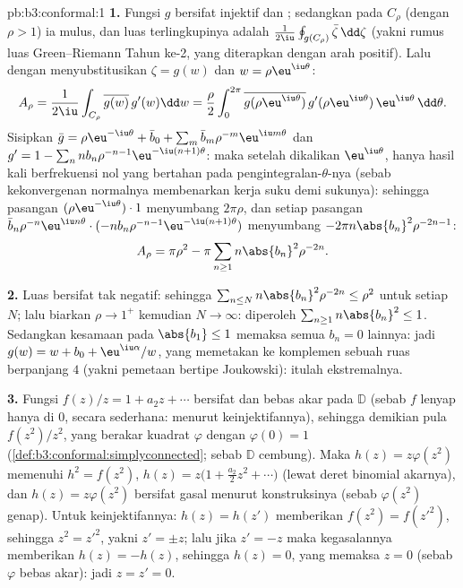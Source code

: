 \begin{solution}{pb:b3:conformal:1}
\textbf{1.} Fungsi $g$ bersifat injektif dan ; sedangkan pada $C_\rho$
(dengan $\rho > 1$) ia mulus, dan luas terlingkupinya adalah
$\frac1{2\iu}\oint_{g(C_\rho)}\bar\zeta\,\dd\zeta$ (yakni rumus luas
Green--Riemann Tahun ke-2, yang diterapkan dengan arah positif).
Lalu dengan menyubstitusikan $\zeta = g(w)$ dan $w =
\rho\eu^{\iu\theta}$:
\[
A_\rho = \frac1{2\iu}\int_{C_\rho}\overline{g(w)}\,g'(w)\dd
w = \frac\rho2\int_0^{2\pi}\overline{g(\rho\eu^{\iu\theta})}
\,g'(\rho\eu^{\iu\theta})\,\eu^{\iu\theta}\,\dd\theta .
\]
Sisipkan $\bar g = \rho\eu^{-\iu\theta} + \bar b_0 +
\sum_m\bar b_m\rho^{-m}\eu^{\iu m\theta}$ dan $g' = 1 -
\sum_nnb_n\rho^{-n-1}\eu^{-\iu(n+1)\theta}$: maka setelah
dikalikan $\eu^{\iu\theta}$, hanya hasil kali berfrekuensi nol yang
bertahan pada pengintegralan-$\theta$-nya (sebab kekonvergenan
normalnya membenarkan kerja suku demi sukunya): sehingga pasangan
$(\rho\eu^{-\iu\theta})\cdot1$ menyumbang $2\pi\rho$, dan
setiap pasangan $\bar b_n\rho^{-n}\eu^{\iu
n\theta}\cdot(-nb_n\rho^{-n-1}\eu^{-\iu(n+1)\theta})$
menyumbang $-2\pi n\abs{b_n}^2\rho^{-2n-1}$:
\[
A_\rho = \pi\rho^2 - \pi\sum_{n\geq1}n\abs{b_n}^2\rho^{-2n}.
\]

\textbf{2.} Luas bersifat tak negatif: sehingga $\sum_{n\leq
N}n\abs{b_n}^2\rho^{-2n} \leq \rho^2$ untuk setiap $N$; lalu biarkan
$\rho \to 1^+$ kemudian $N \to \infty$: diperoleh
$\sum_{n\geq1}n\abs{b_n}^2 \leq 1$. Sedangkan kesamaan pada $\abs{b_1}
\leq 1$ memaksa semua $b_n = 0$ lainnya: jadi $g(w) = w + b_0 +
\eu^{\iu\alpha}/w$, yang memetakan ke komplemen sebuah
ruas berpanjang $4$ (yakni pemetaan bertipe Joukowski): itulah ekstremalnya.

\textbf{3.} Fungsi $f(z)/z = 1 + a_2z + \cdots$ bersifat  dan
bebas akar pada $\mathbb D$ (sebab $f$ lenyap hanya di $0$, secara sederhana:
menurut keinjektifannya), sehingga demikian pula $f(z^2)/z^2$, yang berakar
kuadrat  $\varphi$ dengan $\varphi(0) = 1$
(\cref{def:b3:conformal:simplyconnected}; sebab $\mathbb D$
cembung). Maka $h(z) = z\varphi(z^2)$ memenuhi $h^2 =
f(z^2)$, $h(z) = z\bigl(1 + \frac{a_2}2z^2 + \cdots\bigr)$
(lewat deret binomial akarnya), dan $h(z) = z\varphi(z^2)$ bersifat
gasal menurut konstruksinya (sebab $\varphi(z^2)$ genap). Untuk keinjektifannya: $h(z) = h(z')$ memberikan $f(z^2) =
f(z'^2)$, sehingga $z^2 = z'^2$, yakni $z' = \pm z$; lalu jika $z' = -z$
maka kegasalannya memberikan $h(z) = -h(z)$, sehingga $h(z) = 0$, yang memaksa $z
= 0$ (sebab $\varphi$ bebas akar): jadi $z = z' = 0$.


\end{solution}

